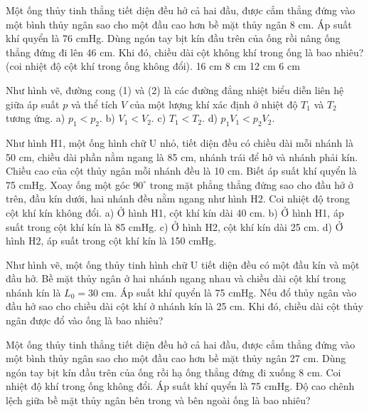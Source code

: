 \begin{ex}
Một ống thủy tinh thẳng tiết diện đều hở cả hai đầu, được cắm thẳng đứng vào một bình thủy ngân sao cho một đầu cao hơn bề mặt thủy ngân 8 cm. Áp suất khí quyển là 76 cmHg. Dùng ngón tay bịt kín đầu trên của ống rồi nâng ống thẳng đứng đi lên 46 cm. Khi đó, chiều dài cột không khí trong ống là bao nhiêu? (coi nhiệt độ cột khí trong ống không đổi).
\choice
{16 cm}
{8 cm}
{12 cm}
{6 cm}
\end{ex}


\begin{ex}
Như hình vẽ, đường cong (1) và (2) là các đường đẳng nhiệt biểu diễn liên hệ giữa áp suất $p$ và thể tích $V$ của một lượng khí xác định ở nhiệt độ $T_1$ và $T_2$ tương ứng.
a) $p_1 < p_2$.
b) $V_1 < V_2$.
c) $T_1 < T_2$.
d) $p_1V_1 < p_2V_2$.
\end{ex}

\begin{ex}
Như hình H1, một ống hình chữ U nhỏ, tiết diện đều có chiều dài mỗi nhánh là 50 cm, chiều dài phần nằm ngang là 85 cm, nhánh trái để hở và nhánh phải kín. Chiều cao của cột thủy ngân mỗi nhánh đều là 10 cm. Biết áp suất khí quyển là 75 cmHg. Xoay ống một góc $90^\circ$ trong mặt phẳng thẳng đứng sao cho đầu hở ở trên, đầu kín dưới, hai nhánh đều nằm ngang như hình H2. Coi nhiệt độ trong cột khí kín không đổi.
a) Ở hình H1, cột khí kín dài 40 cm.
b) Ở hình H1, áp suất trong cột khí kín là 85 cmHg.
c) Ở hình H2, cột khí kín dài 25 cm.
d) Ở hình H2, áp suất trong cột khí kín là 150 cmHg.
\end{ex}


\begin{ex}
Như hình vẽ, một ống thủy tinh hình chữ U tiết diện đều có một đầu kín và một đầu hở. Bề mặt thủy ngân ở hai nhánh ngang nhau và chiều dài cột khí trong nhánh kín là $L_0 = 30$ cm. Áp suất khí quyển là 75 cmHg. Nếu đổ thủy ngân vào đầu hở sao cho chiều dài cột khí ở nhánh kín là 25 cm. Khi đó, chiều dài cột thủy ngân được đổ vào ống là bao nhiêu?
\end{ex}

\begin{ex}
Một ống thủy tinh thẳng tiết diện đều hở cả hai đầu, được cắm thẳng đứng vào một bình thủy ngân sao cho một đầu cao hơn bề mặt thủy ngân 27 cm. Dùng ngón tay bịt kín đầu trên của ống rồi hạ ống thẳng đứng đi xuống 8 cm. Coi nhiệt độ khí trong ống không đổi. Áp suất khí quyển là 75 cmHg. Độ cao chênh lệch giữa bề mặt thủy ngân bên trong và bên ngoài ống là bao nhiêu?
\end{ex}